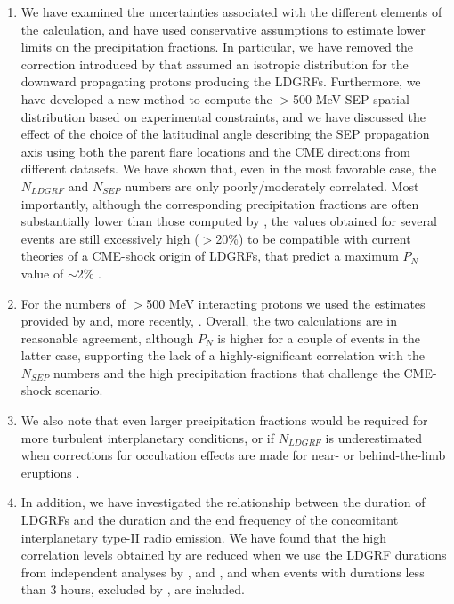 \documentclass{aastex61}
\begin{document}
\begin{enumerate}
    
    \item We have examined the uncertainties associated with the different elements of the calculation, 
    and have used conservative assumptions to estimate lower limits on the 
    precipitation fractions. 
    In particular, 
    we have removed the correction introduced by \citet{ref:SHARE2018} that assumed an isotropic distribution for the downward propagating protons producing the LDGRFs. 
    Furthermore, we have developed a new method to compute the $>$500 MeV SEP spatial distribution based on experimental constraints, and we have discussed the effect of the choice of the latitudinal angle describing the SEP propagation axis using both the parent flare locations and the CME directions from different datasets. We have shown that, even in the most favorable case, the $N_{LDGRF}$ and $N_{SEP}$ numbers are only poorly/moderately correlated.
    Most importantly, although the corresponding precipitation fractions are often substantially lower than those computed by \citet{ref:DENOLFO2019}, the values obtained for several events are still excessively high ($>$20\%) to be compatible with current theories of a CME-shock origin of LDGRFs, that predict a maximum $P_{N}$ value of $\sim$2\% \citep{ref:HUDSON2018,ref:KLEIN2018,ref:HUTCHINSON2022}. 
    
    \item For the numbers of $>$500 MeV interacting protons we used the estimates provided by \citet{ref:SHARE2018} and, more recently, \citet{ref:AJELLO2021}. Overall, the two calculations are in reasonable agreement, although $P_{N}$ is higher for a couple of events in the latter case,
    supporting the lack of a highly-significant correlation with the $N_{SEP}$ numbers and the high precipitation fractions that challenge the CME-shock scenario. 
        
    \item We also note that even larger precipitation fractions would be required for more turbulent interplanetary conditions, or if $N_{LDGRF}$ is underestimated when corrections for occultation effects are made for near- or behind-the-limb eruptions \citep{ref:GOPALSWAMY2021}.
        
\item In addition, we have investigated the relationship between the duration of LDGRFs and the duration and the end frequency of the concomitant interplanetary type-II radio emission. We have found that the high correlation levels obtained by \citet{ref:GOPALSWAMY2018,ref:GOPALSWAMY2019b} are reduced when 
    we use the LDGRF durations from independent analyses by \citet{ref:SHARE2018}, \citet{ref:WINTER2018} and \citet{ref:AJELLO2021}, and when events with durations less than 3 hours, excluded by \citet{ref:GOPALSWAMY2018,ref:GOPALSWAMY2019b}, are included.   

\end{enumerate}
\end{document}
